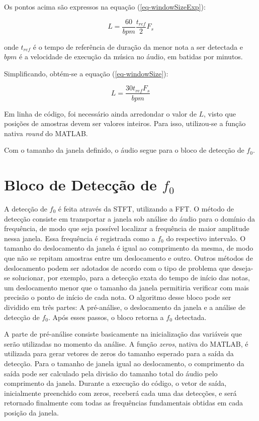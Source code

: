 Os pontos acima são expressos na equação (\ref{eq-windowSizeExp}):

\begin{equation}
L = \frac{60}{bpm}\frac{t_{ref}}{2}F_s
\label{eq-windowSizeExp}
\end{equation}

onde $t_{ref}$ é o tempo de referência de duração da menor nota a ser detectada e $bpm$ é a velocidade de execução da música no áudio, em batidas por minutos. 


Simplificando, obtém-se a equação (\ref{eq-windowSize}):

\begin{equation}
	L = \frac{30t_{ref} F_s}{bpm}
	\label{eq-windowSize}
\end{equation}

Em linha de código, foi necessário ainda arredondar o valor de $L$, visto que posições de amostras devem ser valores inteiros. Para isso, utilizou-se a função nativa \textit{round} do MATLAB\rreg.


Com o tamanho da janela definido, o áudio segue para o bloco de detecção de $f_0$.

\section{Bloco de Detecção de $f_0$}

A detecção de $f_0$ é feita através da STFT, utilizando a FFT. O método de detecção consiste em transportar a janela sob análise do áudio para o domínio da frequência, de modo que seja possível localizar a frequência de maior amplitude nessa janela. Essa frequência é registrada como a $f_0$ do respectivo intervalo. O tamanho do deslocamento da janela é igual ao comprimento da mesma, de modo que não se repitam amostras entre um deslocamento e outro. Outros métodos de deslocamento podem ser adotados de acordo com o tipo de problema que deseja-se solucionar, por exemplo, para a detecção exata do tempo de início das notas, um deslocamento menor que o tamanho da janela permitiria verificar com mais precisão o ponto de início de cada nota. O algoritmo desse bloco pode ser dividido em três partes: A pré-análise, o deslocamento da janela e a análise de detecção de $f_0$. Após esses passos, o bloco retorna a $f_0$ detectada.


A parte de pré-análise consiste basicamente na inicialização das variáveis que serão utilizadas no momento da análise. A função \textit{zeros}, nativa do MATLAB\rreg, é utilizada para gerar vetores de zeros do tamanho esperado para a saída da detecção. Para o tamanho de janela igual ao deslocamento, o comprimento da saída pode ser calculado pela divisão do tamanho total do áudio pelo comprimento da janela. Durante a execução do código, o vetor de saída, inicialmente preenchido com zeros, receberá cada uma das detecções, e será retornado finalmente com todas as frequências fundamentais obtidas em cada posição da janela.



